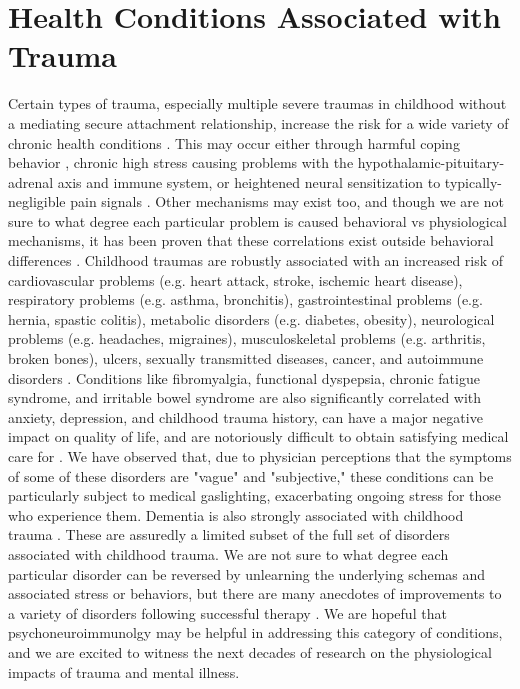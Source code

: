 \documentclass[12pt,letterpaper]{book}
\begin{document}
\section{Health Conditions Associated with Trauma}
Certain types of trauma, especially multiple severe traumas in childhood without a mediating secure attachment relationship, increase the risk for a wide variety of chronic health conditions \cite{harris2018deepest}. This may occur either through harmful coping behavior \cite{felittiACE}, chronic high stress causing problems with the hypothalamic-pituitary-adrenal axis \cite{CSAHealth} and immune system, or heightened neural sensitization to typically-negligible pain signals \cite{karimov2024childhood,fitzcharles2021nociplastic}. Other mechanisms may exist too, and though we are not sure to what degree each particular problem is caused behavioral vs physiological mechanisms, it has been proven that these correlations exist outside behavioral differences \cite{felittiACE}. Childhood traumas are robustly associated with an increased risk of cardiovascular problems (e.g. heart attack, stroke, ischemic heart disease), respiratory problems (e.g. asthma, bronchitis), gastrointestinal problems (e.g. hernia, spastic colitis), metabolic disorders (e.g. diabetes, obesity), neurological problems (e.g. headaches, migraines), musculoskeletal problems (e.g. arthritis, broken bones), ulcers, sexually transmitted diseases, cancer, and autoimmune disorders \cite{wegman2009meta,norman2012long,hughes2017effect}. Conditions like fibromyalgia, functional dyspepsia, chronic fatigue syndrome, and irritable bowel syndrome are also significantly correlated with anxiety, depression, and childhood trauma history, can have a major negative impact on quality of life, and are notoriously difficult to obtain satisfying medical care for \cite{henningsenSomatic,gardoki2022prevalence,silvernale2024relationship}. We have observed that, due to physician perceptions that the symptoms of some of these disorders are "vague" and "subjective," these conditions can be particularly subject to medical gaslighting, exacerbating ongoing stress for those who experience them. Dementia is also strongly associated with childhood trauma \cite{severs2023traumatic}. These are assuredly a limited subset of the full set of disorders associated with childhood trauma. We are not sure to what degree each particular disorder can be reversed by unlearning the underlying schemas and associated stress or behaviors, but there are many anecdotes of improvements to a variety of disorders following successful therapy \cite{vanderKolkBody}. We are hopeful that psychoneuroimmunolgy may be helpful in addressing this category of conditions, and we are excited to witness the next decades of research on the physiological impacts of trauma and mental illness.
\end{document}
